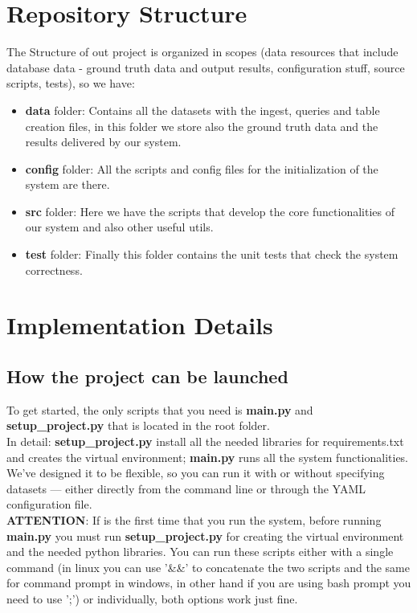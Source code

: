 \documentclass[12pt,a4paper]{article}
\begin{document}
\section{Repository Structure}
The Structure of out project is organized in scopes (data resources that include database data - ground truth data and output results, configuration stuff,  source scripts, tests), so we have:\\
\begin{itemize}
    \item \textbf{data} folder: Contains all the datasets with the ingest, queries and table creation files, in this folder we store also the ground truth data and the results delivered by our system.
    \item \textbf{config} folder: All the scripts and config files for the initialization of the system are there.
    \item \textbf{src} folder: Here we have the scripts that develop the core functionalities of our system and also other useful utils. 
    \item \textbf{test} folder: Finally this folder contains the unit tests that check the system correctness.
\end{itemize}

\section{Implementation Details}

\subsection{How the project can be launched}
To get started, the only scripts that you need is \textbf{main.py} and \textbf{setup\_project.py} that is located in the root folder.
\\In detail:
\textbf{setup\_project.py} install all the needed libraries for requirements.txt and creates the virtual environment;
\textbf{main.py} runs all the system functionalities. We’ve designed it to be flexible, so you can run it with or without specifying datasets — either directly from the command line or through the YAML configuration file.
\\\textbf{ATTENTION}: If is the first time that you run the system, before running \textbf{main.py} you must run \textbf{setup\_project.py} for creating the virtual environment and the needed python libraries.
You can run these scripts either with a single command  (in linux you can use '\&\&' to concatenate the two scripts and the same for command prompt in windows, in other hand if you are using bash prompt you need to use ';') or individually, both options work just fine.
\end{document}
